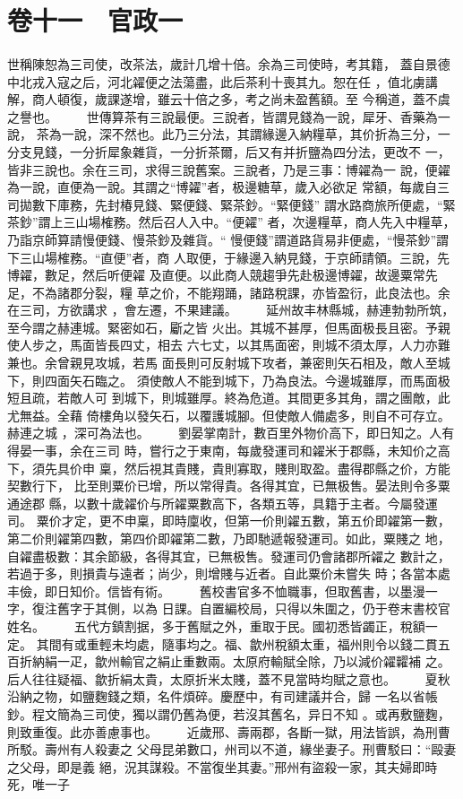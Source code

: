 \documentclass{ctexart}
\begin{document}
\section{卷十一　官政一}
\paragraph{}
世稱陳恕為三司使，改茶法，歲計几增十倍。余為三司使時，考其籍， 蓋自景德中北戎入寇之后，河北糴便之法蕩盡，此后茶利十喪其九。恕在任 ，值北虜講解，商人頓復，歲課遂增，雖云十倍之多，考之尚未盈舊額。至 今稱道，蓋不虞之譽也。 　　世傳算茶有三說最便。三說者，皆謂見錢為一說，犀牙、香藥為一說， 茶為一說，深不然也。此乃三分法，其謂緣邊入納糧草，其价折為三分，一 分支見錢，一分折犀象雜貨，一分折茶爾，后又有并折鹽為四分法，更改不 一，皆非三說也。余在三司，求得三說舊案。三說者，乃是三事：博糴為一 說，便糴為一說，直便為一說。其謂之``博糴''者，极邊糖草，歲入必欲足 常額，每歲自三司拋數下庫務，先封椿見錢、緊便錢、緊茶鈔。``緊便錢'' 謂水路商旅所便處，``緊茶鈔''謂上三山場榷務。然后召人入中。``便糴'' 者，次邊糧草，商人先入中糧草，乃詣京師算請慢便錢、慢茶鈔及雜貨。`` 慢便錢''謂道路貨易非便處，``慢茶鈔''謂下三山場榷務。``直便''者，商 人取便，于緣邊入納見錢，于京師請領。三說，先博糴，數足，然后听便糴 及直便。以此商人競趨爭先赴极邊博糴，故邊粟常先足，不為諸郡分裂，糧 草之价，不能翔踊，諸路稅課，亦皆盈衍，此良法也。余在三司，方欲講求 ，會左遷，不果建議。 　　延州故丰林縣城，赫連勃勃所筑，至今謂之赫連城。緊密如石，斸之皆 火出。其城不甚厚，但馬面极長且密。予親使人步之，馬面皆長四丈，相去 六七丈，以其馬面密，則城不須太厚，人力亦難兼也。余曾親見攻城，若馬 面長則可反射城下攻者，兼密則矢石相及，敵人至城下，則四面矢石臨之。 須使敵人不能到城下，乃為良法。今邊城雖厚，而馬面极短且疏，若敵人可 到城下，則城雖厚。終為危道。其間更多其角，謂之團敵，此尤無益。全藉 倚樓角以發矢石，以覆護城腳。但使敵人備處多，則自不可存立。赫連之城 ，深可為法也。 　　劉晏掌南計，數百里外物价高下，即日知之。人有得晏一事，余在三司 時，嘗行之于東南，每歲發運司和糴米于郡縣，未知价之高下，須先具价申 稟，然后視其貴賤，貴則寡取，賤則取盈。盡得郡縣之价，方能契數行下， 比至則粟价已增，所以常得貴。各得其宜，已無极售。晏法則令多粟通途郡 縣，以數十歲糴价与所糴粟數高下，各類五等，具籍于主者。今屬發運司。 粟价才定，更不申稟，即時廩收，但第一价則糴五數，第五价即糴第一數， 第二价則糴第四數，第四价即糴第二數，乃即馳遞報發運司。如此，粟賤之 地，自糴盡极數：其余節級，各得其宜，已無极售。發運司仍會諸郡所糴之 數計之，若過于多，則損貴与遠者；尚少，則增賤与近者。自此粟价未嘗失 時；各當本處丰儉，即日知价。信皆有術。 　　舊校書官多不恤職事，但取舊書，以墨漫一字，復注舊字于其側，以為 日課。自置編校局，只得以朱圍之，仍于卷末書校官姓名。 　　五代方鎮割据，多于舊賦之外，重取于民。國初悉皆蠲正，稅額一定。 其間有或重輕未均處，隨事均之。福、歙州稅額太重，福州則令以錢二貫五 百折納絹一疋，歙州輸官之絹止重數兩。太原府輸賦全除，乃以減价糴糶補 之。后人往往疑福、歙折絹太貴，太原折米太賤，蓋不見當時均賦之意也。 　　夏秋沿納之物，如鹽麴錢之類，名件煩碎。慶歷中，有司建議并合，歸 一名以省帳鈔。程文簡為三司使，獨以謂仍舊為便，若沒其舊名，异日不知 。或再敷鹽麴，則致重復。此亦善慮事也。 　　近歲邢、壽兩郡，各斷一獄，用法皆誤，為刑曹所駁。壽州有人殺妻之 父母昆弟數口，州司以不道，緣坐妻子。刑曹駁曰：``毆妻之父母，即是義 絕，況其謀殺。不當復坐其妻。''邢州有盜殺一家，其夫婦即時死，唯一子 
\end{document}
